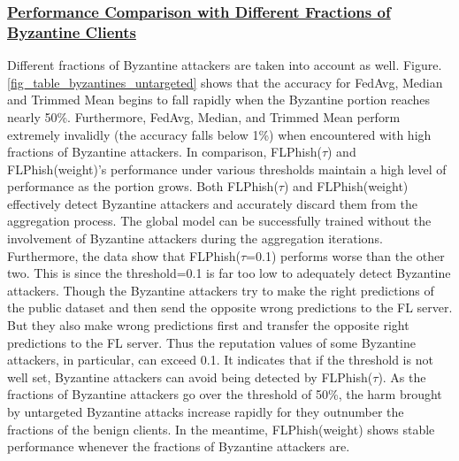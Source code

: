 \documentclass[journal]{IEEEtran}
\begin{document}
    \subsubsection{\ul{Performance Comparison with Different Fractions of Byzantine Clients}} Different fractions of Byzantine attackers are taken into account as well. Figure. \ref{fig_table_byzantines_untargeted} shows that the accuracy for FedAvg, Median and Trimmed Mean begins to fall rapidly when the Byzantine portion reaches nearly 50\%. Furthermore, FedAvg, Median, and Trimmed Mean perform extremely invalidly (the accuracy falls below 1\%) when encountered with high fractions of Byzantine attackers. In comparison, FLPhish($\tau$) and FLPhish(weight)'s performance under various thresholds maintain a high level of performance as the portion grows. Both FLPhish($\tau$) and FLPhish(weight) effectively detect Byzantine attackers and accurately discard them from the aggregation process. The global model can be successfully trained without the involvement of Byzantine attackers during the aggregation iterations. Furthermore, the data show that FLPhish($\tau$=0.1) performs worse than the other two. This is since the threshold=0.1 is far too low to adequately detect Byzantine attackers. Though the Byzantine attackers try to make the right predictions of the public dataset and then send the opposite wrong predictions to the FL server. But they also make wrong predictions first and transfer the opposite right predictions to the FL server. Thus the reputation values of some Byzantine attackers, in particular, can exceed 0.1. It indicates that if the threshold is not well set, Byzantine attackers can avoid being detected by FLPhish($\tau$). As the fractions of Byzantine attackers go over the threshold of 50\%, the harm brought by untargeted Byzantine attacks increase rapidly for they outnumber the fractions of the benign clients. In the meantime, FLPhish(weight) shows stable performance whenever the fractions of Byzantine attackers are.

\end{document}
